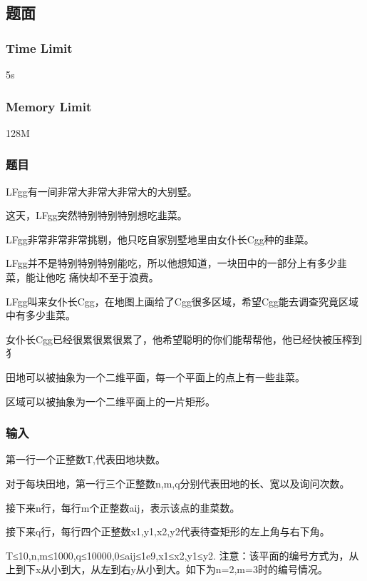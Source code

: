\subsection{题面}

\subsubsection{Time Limit}
5s

\subsubsection{Memory Limit}
128M

\subsubsection{题目}
LFgg有一间非常大非常大非常大的大别墅。

这天，LFgg突然特别特别特别想吃韭菜。

LFgg非常非常非常挑剔，他只吃自家别墅地里由女仆长Cgg种的韭菜。

LFgg并不是特别特别特别能吃，所以他想知道，一块田中的一部分上有多少韭菜，能让他吃
痛快却不至于浪费。

LFgg叫来女仆长Cgg，在地图上画给了Cgg很多区域，希望Cgg能去调查究竟区域中有多少韭菜。

女仆长Cgg已经很累很累很累了，他希望聪明的你们能帮帮他，他已经快被压榨到犭

田地可以被抽象为一个二维平面，每一个平面上的点上有一些韭菜。

区域可以被抽象为一个二维平面上的一片矩形。

\subsubsection{输入}
第一行一个正整数T,代表田地块数。

对于每块田地，第一行三个正整数n,m,q分别代表田地的长、宽以及询问次数。

接下来n行，每行m个正整数aij，表示该点的韭菜数。

接下来q行，每行四个正整数x1,y1,x2,y2代表待查矩形的左上角与右下角。

T≤10,n,m≤1000,q≤10000,0≤aij≤1e9,x1≤x2,y1≤y2.
注意：该平面的编号方式为，从上到下x从小到大，从左到右y从小到大。如下为n=2,m=3时的编号情况。

